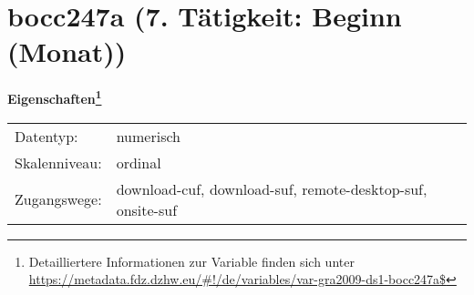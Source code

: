 
    \setcounter{footnote}{0}

    \vspace*{-1.8cm}
	\section{bocc247a (7. Tätigkeit: Beginn (Monat))}
	\label{section:bocc247a}



    \vspace*{0.5cm}
    \noindent\textbf{Eigenschaften\footnote{Detailliertere Informationen zur Variable finden sich unter
		\url{https://metadata.fdz.dzhw.eu/\#!/de/variables/var-gra2009-ds1-bocc247a$}}}\\
	\begin{tabularx}{\hsize}{@{}lX}
	Datentyp: & numerisch \\
	Skalenniveau: & ordinal \\
	Zugangswege: &
	  download-cuf, 
	  download-suf, 
	  remote-desktop-suf, 
	  onsite-suf
 \\
    \end{tabularx}



